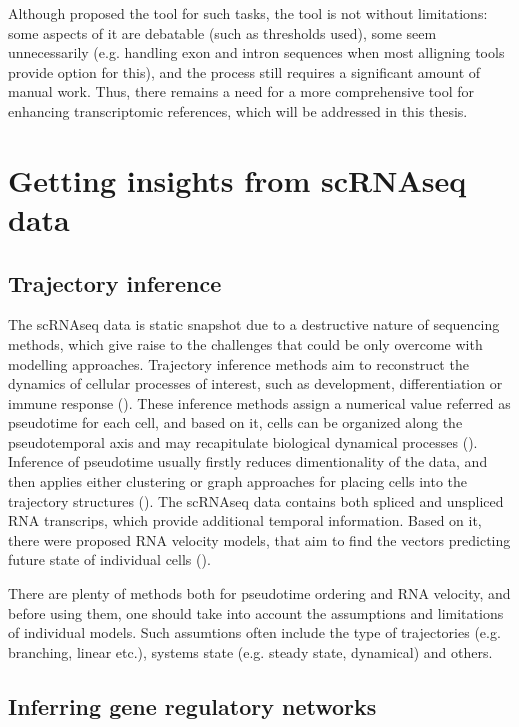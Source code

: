 Although \textcite{Pool2023} proposed the tool for such tasks, the tool is not without limitations:
some aspects of it are debatable (such as thresholds used), some seem unnecessarily
(e.g. handling exon and intron sequences when most alligning tools provide option for this),
and the process still requires a significant amount of manual work.
Thus, there remains a need for a more comprehensive tool for enhancing transcriptomic references,
which will be addressed in this thesis.

\section{Getting insights from scRNAseq data}

\subsection{Trajectory inference}

The scRNAseq data is static snapshot due to a destructive nature of sequencing methods,
which give raise to the challenges that could be only overcome with modelling approaches.
Trajectory inference methods aim to reconstruct the dynamics of cellular processes of interest,
such as development, differentiation or immune response (\cite{Deconinck2021}).
These inference methods assign a numerical value referred as pseudotime for each cell, and based on it,
cells can be organized along the pseudotemporal axis and may recapitulate biological dynamical processes (\cite{Wang2021}).
Inference of pseudotime usually firstly reduces dimentionality of the data, and then applies either clustering or graph approaches
for placing cells into the trajectory structures (\cite{Deconinck2021}).
The scRNAseq data contains both spliced and unspliced RNA transcrips, which provide additional temporal information.
Based on it, there were proposed RNA velocity models, that aim to find the vectors predicting future state of individual cells (\cite{Manno2018}).

There are plenty of methods both for pseudotime ordering and RNA velocity, and before using them,
one should take into account the assumptions and limitations of individual models.
Such assumtions often include the type of trajectories (e.g. branching, linear etc.), systems state (e.g. steady state, dynamical) and others.

\subsection{Inferring gene regulatory networks}

